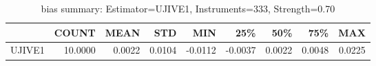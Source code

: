 \begin{table}[ht]
\centering
\caption{bias summary: Estimator=UJIVE1, Instruments=333, Strength=0.70}
\begin{tabular}{lrrrrrrrr}
\toprule
 & COUNT & MEAN & STD & MIN & 25\% & 50\% & 75\% & MAX \\
\midrule
UJIVE1 & 10.0000 & 0.0022 & 0.0104 & -0.0112 & -0.0037 & 0.0022 & 0.0048 & 0.0225 \\
\bottomrule
\end{tabular}
\end{table}
